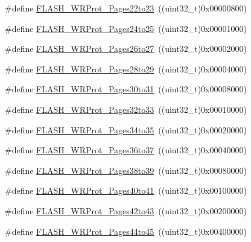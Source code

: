 \begin{DoxyCompactItemize}
\#define \mbox{\hyperlink{group___option___bytes___write___protection_ga58394c78e6b08542381ade1674efe62c}{F\+L\+A\+S\+H\+\_\+\+W\+R\+Prot\+\_\+\+Pages22to23}}~((uint32\+\_\+t)0x00000800)
\item 
\#define \mbox{\hyperlink{group___option___bytes___write___protection_gac36c4a402c77b28f46451e97dc3632f7}{F\+L\+A\+S\+H\+\_\+\+W\+R\+Prot\+\_\+\+Pages24to25}}~((uint32\+\_\+t)0x00001000)
\item 
\#define \mbox{\hyperlink{group___option___bytes___write___protection_ga92c8a9f8b6875fccb072df795eff5e7e}{F\+L\+A\+S\+H\+\_\+\+W\+R\+Prot\+\_\+\+Pages26to27}}~((uint32\+\_\+t)0x00002000)
\item 
\#define \mbox{\hyperlink{group___option___bytes___write___protection_gae42c20bedcbaf926c7c49f51a7eea63f}{F\+L\+A\+S\+H\+\_\+\+W\+R\+Prot\+\_\+\+Pages28to29}}~((uint32\+\_\+t)0x00004000)
\item 
\#define \mbox{\hyperlink{group___option___bytes___write___protection_gaabe41461f613c6eb37c782295ad9f90f}{F\+L\+A\+S\+H\+\_\+\+W\+R\+Prot\+\_\+\+Pages30to31}}~((uint32\+\_\+t)0x00008000)
\item 
\#define \mbox{\hyperlink{group___option___bytes___write___protection_ga86aa121a8917e58ad6bfdf98ba873d36}{F\+L\+A\+S\+H\+\_\+\+W\+R\+Prot\+\_\+\+Pages32to33}}~((uint32\+\_\+t)0x00010000)
\item 
\#define \mbox{\hyperlink{group___option___bytes___write___protection_gaa5fee32ae0631b81413414f8e716868b}{F\+L\+A\+S\+H\+\_\+\+W\+R\+Prot\+\_\+\+Pages34to35}}~((uint32\+\_\+t)0x00020000)
\item 
\#define \mbox{\hyperlink{group___option___bytes___write___protection_gab00dc29c0f12afd25cdb21b6d187ccc9}{F\+L\+A\+S\+H\+\_\+\+W\+R\+Prot\+\_\+\+Pages36to37}}~((uint32\+\_\+t)0x00040000)
\item 
\#define \mbox{\hyperlink{group___option___bytes___write___protection_gacd33bf5c4a305a271da6035ed19cefc2}{F\+L\+A\+S\+H\+\_\+\+W\+R\+Prot\+\_\+\+Pages38to39}}~((uint32\+\_\+t)0x00080000)
\item 
\#define \mbox{\hyperlink{group___option___bytes___write___protection_gaaf0c1391987f76b381d26ff4b5142268}{F\+L\+A\+S\+H\+\_\+\+W\+R\+Prot\+\_\+\+Pages40to41}}~((uint32\+\_\+t)0x00100000)
\item 
\#define \mbox{\hyperlink{group___option___bytes___write___protection_gab9583317ad7ec30119cdd97e17e74121}{F\+L\+A\+S\+H\+\_\+\+W\+R\+Prot\+\_\+\+Pages42to43}}~((uint32\+\_\+t)0x00200000)
\item 
\#define \mbox{\hyperlink{group___option___bytes___write___protection_ga934a862a6a5cd350f00f5ded27e4bbd4}{F\+L\+A\+S\+H\+\_\+\+W\+R\+Prot\+\_\+\+Pages44to45}}~((uint32\+\_\+t)0x00400000)

\end{DoxyCompactItemize}
